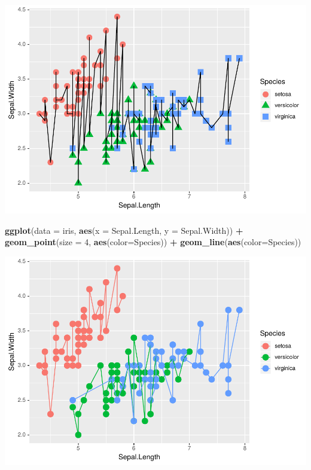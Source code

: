 \documentclass[
]{krantz}
\makeatletter
\newenvironment{Shaded}{\begin{snugshade}}{\end{snugshade}}
\newcommand{\DataTypeTok}[1]{\textcolor[rgb]{0.27,0.27,0.27}{#1}}
\newcommand{\DecValTok}[1]{\textcolor[rgb]{0.06,0.06,0.06}{#1}}
\newcommand{\KeywordTok}[1]{\textcolor[rgb]{0.27,0.27,0.27}{\textbf{#1}}}
\newcommand{\NormalTok}[1]{#1}
\newcommand{\OperatorTok}[1]{\textcolor[rgb]{0.43,0.43,0.43}{\textbf{#1}}}
\newcommand{\StringTok}[1]{\textcolor[rgb]{0.5,0.5,0.5}{#1}}
\newenvironment{kframe}{%
\medskip{}
\setlength{\fboxsep}{.8em}
 \def\at@end@of@kframe{}%
 \ifinner\ifhmode%
  \def\at@end@of@kframe{\end{minipage}}%
  \begin{minipage}{\columnwidth}%
 \fi\fi%
 \def\FrameCommand##1{\hskip\@totalleftmargin \hskip-\fboxsep
 \colorbox{shadecolor}{##1}\hskip-\fboxsep
     \hskip-\linewidth \hskip-\@totalleftmargin \hskip\columnwidth}%
 \MakeFramed {\advance\hsize-\width
   \@totalleftmargin\z@ \linewidth\hsize
   \@setminipage}}%
 {\par\unskip\endMakeFramed%
 \at@end@of@kframe}
\renewenvironment{Shaded}{\begin{kframe}}{\end{kframe}}
\makeatother
\begin{document}
\includegraphics{bookdown_files/figure-latex/unnamed-chunk-65-1.pdf}

\begin{Shaded}
\begin{Highlighting}[]
\KeywordTok{ggplot}\NormalTok{(}\DataTypeTok{data =}\NormalTok{ iris, }\KeywordTok{aes}\NormalTok{(}\DataTypeTok{x =}\NormalTok{ Sepal.Length, }\DataTypeTok{y =}\NormalTok{ Sepal.Width)) }\OperatorTok{+}\StringTok{ }
\StringTok{    }\KeywordTok{geom\_point}\NormalTok{(}\DataTypeTok{size =} \DecValTok{4}\NormalTok{, }\KeywordTok{aes}\NormalTok{(}\DataTypeTok{color=}\NormalTok{Species)) }\OperatorTok{+}\StringTok{ }
\StringTok{    }\KeywordTok{geom\_line}\NormalTok{(}\KeywordTok{aes}\NormalTok{(}\DataTypeTok{color=}\NormalTok{Species))}
\end{Highlighting}
\end{Shaded}

\includegraphics{bookdown_files/figure-latex/unnamed-chunk-66-1.pdf}
\end{document}
